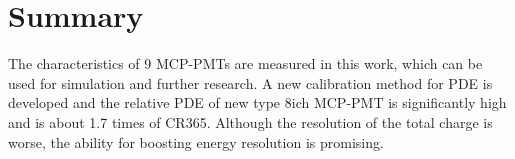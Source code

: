 \section{Summary}
\label{Summary}
The characteristics of 9 MCP-PMTs are measured in this work, which can be used for simulation and further research. A new calibration method for PDE is developed and the relative PDE of new type 8ich MCP-PMT is significantly high and is about 1.7 times of CR365. Although the resolution of the total charge is worse, the ability for boosting energy resolution is promising.